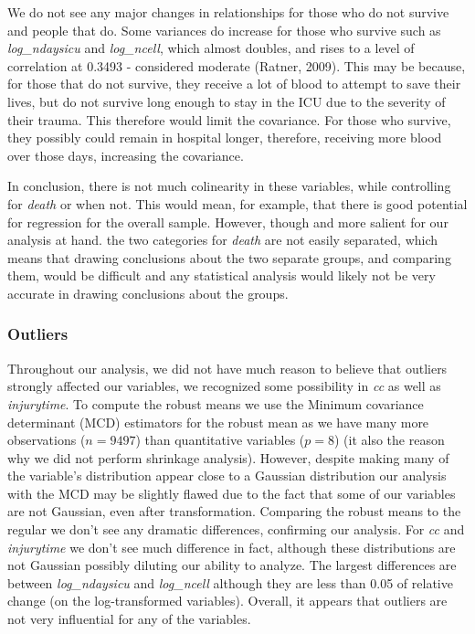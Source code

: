 \documentclass[
]{article}
\begin{document}
\newpage

We do not see any major changes in relationships for those who do not
survive and people that do. Some variances do increase for those who
survive such as \emph{log\_ndaysicu} and \emph{log\_ncell}, which almost
doubles, and rises to a level of correlation at 0.3493 - considered
moderate (Ratner, 2009). This may be because, for those that do not
survive, they receive a lot of blood to attempt to save their lives, but
do not survive long enough to stay in the ICU due to the severity of
their trauma. This therefore would limit the covariance. For those who
survive, they possibly could remain in hospital longer, therefore,
receiving more blood over those days, increasing the covariance.

In conclusion, there is not much colinearity in these variables, while
controlling for \emph{death} or when not. This would mean, for example,
that there is good potential for regression for the overall sample.
However, though and more salient for our analysis at hand. the two
categories for \emph{death} are not easily separated, which means that
drawing conclusions about the two separate groups, and comparing them,
would be difficult and any statistical analysis would likely not be very
accurate in drawing conclusions about the groups.

\hypertarget{outliers}{%
\subsubsection{Outliers}\label{outliers}}

Throughout our analysis, we did not have much reason to believe that
outliers strongly affected our variables, we recognized some possibility
in \emph{cc} as well as \emph{injurytime}. To compute the robust means
we use the Minimum covariance determinant (MCD) estimators for the
robust mean as we have many more observations (\(n = 9497\)) than
quantitative variables (\(p=8\)) (it also the reason why we did not
perform shrinkage analysis). However, despite making many of the
variable's distribution appear close to a Gaussian distribution our
analysis with the MCD may be slightly flawed due to the fact that some
of our variables are not Gaussian, even after transformation. Comparing
the robust means to the regular we don't see any dramatic differences,
confirming our analysis. For \emph{cc} and \emph{injurytime} we don't
see much difference in fact, although these distributions are not
Gaussian possibly diluting our ability to analyze. The largest
differences are between \emph{log\_ndaysicu} and \emph{log\_ncell}
although they are less than 0.05 of relative change (on the
log-transformed variables). Overall, it appears that outliers are not
very influential for any of the variables.
\end{document}
